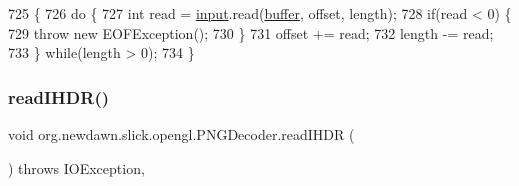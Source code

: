 \begin{DoxyCode}
725                                                                                      \{
726         \textcolor{keywordflow}{do} \{
727             \textcolor{keywordtype}{int} read = \mbox{\hyperlink{classorg_1_1newdawn_1_1slick_1_1opengl_1_1_p_n_g_decoder_a5714583b8e4e668d86f45065cda6e20b}{input}}.read(\mbox{\hyperlink{classorg_1_1newdawn_1_1slick_1_1opengl_1_1_p_n_g_decoder_ae205f9222586a2bc01a8a240c5c210ad}{buffer}}, offset, length);
728             \textcolor{keywordflow}{if}(read < 0) \{
729                 \textcolor{keywordflow}{throw} \textcolor{keyword}{new} EOFException();
730             \}
731             offset += read;
732             length -= read;
733         \} \textcolor{keywordflow}{while}(length > 0);
734     \}
\end{DoxyCode}
\mbox{\label{classorg_1_1newdawn_1_1slick_1_1opengl_1_1_p_n_g_decoder_a9e7ed3f5ce8aaf724e3da6bdd9db1bd1}} 
\subsubsection{\texorpdfstring{read\+I\+H\+D\+R()}{readIHDR()}}
{\footnotesize\ttfamily void org.\+newdawn.\+slick.\+opengl.\+P\+N\+G\+Decoder.\+read\+I\+H\+DR (\begin{DoxyParamCaption}{ }\end{DoxyParamCaption}) throws I\+O\+Exception\hspace{0.3cm}{\ttfamily [inline]}, {\ttfamily [private]}}


